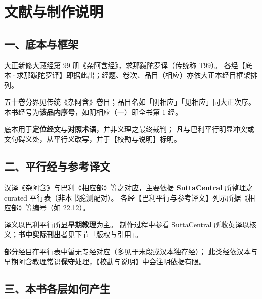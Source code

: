 
\chapter*{文献与制作说明}

\section*{一、底本与框架}

\begin{description}[style=nextline,leftmargin=3.2em]
  \item[汉译底本]
  大正新修大藏经第 99 册《杂阿含经》，求那跋陀罗译（传统称 T99）。
  各经【底本·求那跋陀罗译】即据此出；经题、卷次、品目（相应）亦依大正本经目框架排列。
  \item[卷次与品目]
  五十卷分界见传统《杂阿含》卷目；品目名如「阴相应」「见相应」同大正次序。
  本书经号为\textbf{该品内序号}，如阴相应（一）即全书第 1 经。
  \item[底本地位]
  底本用于\textbf{定位经文}与\textbf{对照术语}，并非义理之最终裁判；
  凡与巴利平行明显冲突或文句碍义处，从平行义改写，并于【校勘与说明】标明。
\end{description}

\section*{二、平行经与参考译文}

\begin{description}[style=nextline,leftmargin=3.2em]
  \item[平行关系]
  汉译《杂阿含》与巴利《相应部》等之对应，主要依据
  \textbf{SuttaCentral} 所整理之 curated 平行表（非本书臆测配对）。
  各经【巴利平行与参考译文】列示所据《相应部》等编号（如 22.12）。
  \item[义理裁判]
  译义以巴利平行所显\textbf{早期教理}为主。
  制作过程中参看 SuttaCentral 所收英译以核义；\textbf{书中实际刊出}者见下节「版权与引用」。
  \item[无平行时]
  部分经目在平行表中暂无专经对应（多见于末段或汉本独存经）；
  此类经依汉本与早期阿含教理常识\textbf{保守}处理，【校勘与说明】中会注明依据有限。
\end{description}

\section*{三、本书各层如何产生}

